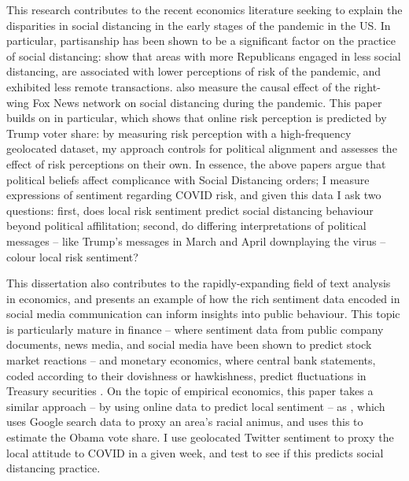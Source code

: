 \documentclass{article}
\begin{document}
This research contributes to the recent economics literature seeking to explain the disparities in social distancing in the early stages of the pandemic in the US. In particular, partisanship has been shown to be a significant factor on the practice of social distancing: \textcite{allcottPolarizationPublicHealth2020,barriosRiskPerceptionLens2020,painterPoliticalBeliefsAffect2020} show that areas with more Republicans engaged in less social distancing, are associated with lower perceptions of risk of the pandemic, and exhibited less remote transactions. \textcite{simonovPersuasiveEffectFox2020,ananyevSafestTimeFly2020} also measure the causal effect of the right-wing Fox News network on social distancing during the pandemic. This paper builds on \textcite{barriosRiskPerceptionLens2020} in particular, which shows that online risk perception is predicted by Trump voter share: by measuring risk perception with a high-frequency geolocated dataset, my approach controls for political alignment and assesses the effect of risk perceptions on their own. In essence, the above papers argue that political beliefs affect complicance with Social Distancing orders; I measure expressions of sentiment regarding COVID risk, and given this data I ask two questions: first, does local risk sentiment predict social distancing behaviour beyond political affilitation; second, do differing interpretations of political messages -- like Trump's messages in March and April downplaying the virus -- colour local risk sentiment?


This dissertation also contributes to the rapidly-expanding field of text analysis in economics, and presents an example of how the rich sentiment data encoded in social media communication can inform insights into public behaviour. This topic is particularly mature in finance -- where sentiment data from public company documents, news media, and social media have been shown to predict stock market reactions \parencite{bollenTwitterMoodPredicts2011} -- and monetary economics, where central bank statements, coded according to their dovishness or hawkishness, predict fluctuations in Treasury securities \parencite{luccaMeasuringCentralBank2009,gentzkowTextData2019}. On the topic of empirical economics, this paper takes a similar approach -- by using online data to predict local sentiment -- as \textcite{stephens-davidowitzCostRacialAnimus2014}, which uses Google search data to proxy an area's racial animus, and uses this to estimate the Obama vote share. I use geolocated Twitter sentiment to proxy the local attitude to COVID in a given week, and test to see if this predicts social distancing practice. 
\end{document}
